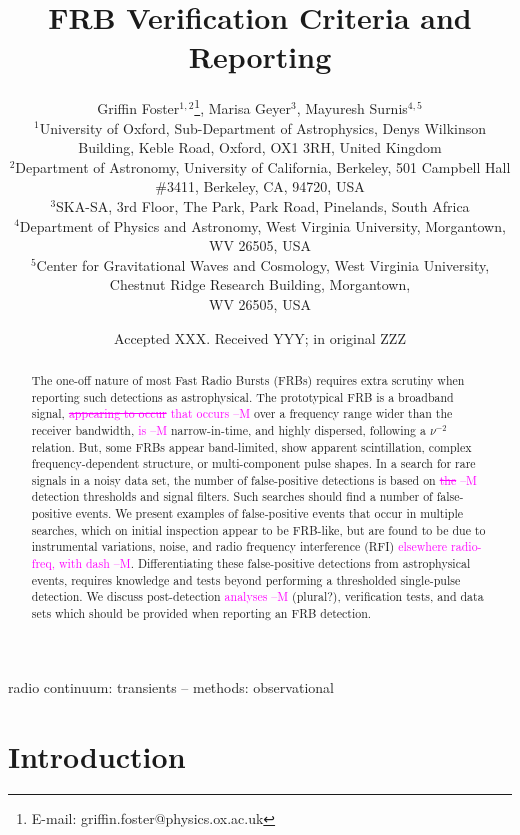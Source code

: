 \documentclass[a4paper,fleqn,usenatbib]{mnras}
\title[FRB Verification Criteria and Reporting]{FRB Verification Criteria and Reporting}
\author[G. Foster et al.]{
Griffin Foster$^{1,2}$\thanks{E-mail: griffin.foster@physics.ox.ac.uk},
Marisa Geyer$^{3}$,
Mayuresh Surnis$^{4,5}$
\\
$^{1}$University of Oxford, Sub-Department of Astrophysics, Denys Wilkinson Building, Keble Road, Oxford, OX1 3RH, United Kingdom\\
$^{2}$Department of Astronomy, University of California, Berkeley, 501 Campbell
Hall \#3411, Berkeley, CA, 94720, USA\\
$^{3}$SKA-SA, 3rd Floor, The Park, Park Road, Pinelands, South Africa\\
$^{4}$Department of Physics and Astronomy, West Virginia University, Morgantown, WV 26505, USA\\
$^{5}$Center for Gravitational Waves and Cosmology, West Virginia University, Chestnut Ridge Research Building, Morgantown,\\ WV 26505, USA\\
}
\date{Accepted XXX. Received YYY; in original ZZZ}
\newcommand{\cM}[1]{\textcolor{magenta}{ #1 --M}}
\begin{document}
\label{firstpage}
\pagerange{\pageref{firstpage}--\pageref{lastpage}}
\maketitle

\begin{abstract}
The one-off nature of most Fast Radio Bursts (FRBs) requires extra scrutiny when
reporting such detections as astrophysical.  The prototypical FRB is a broadband
signal, \cM{\sout{appearing to occur} that occurs} over a frequency range wider than the receiver
bandwidth, \cM{is} narrow-in-time, and highly dispersed, following a $\nu^{-2}$
relation.  But, some FRBs appear band-limited, show apparent scintillation,
complex frequency-dependent structure, or multi-component pulse shapes.  In a
search for rare signals in a noisy data set, the number of false-positive
detections is based on \cM{\sout{the}} detection thresholds and signal filters.  Such
searches should find a number of false-positive events.  We present examples of
false-positive events that occur in multiple searches, which on initial
inspection appear to be FRB-like, but are found to be due to instrumental
variations, noise, and radio frequency interference (RFI) \cM{elsewhere radio-freq, with dash}.  Differentiating
these false-positive detections from astrophysical events, requires knowledge
and tests beyond performing a thresholded single-pulse detection.  We discuss
post-detection \cM{analyses} (plural?), verification tests, and data sets which should be
provided when reporting an FRB detection.
\end{abstract}

\begin{keywords}
radio continuum: transients -- methods: observational
\end{keywords}


\section{Introduction}
\label{sec:intro}
\end{document}

